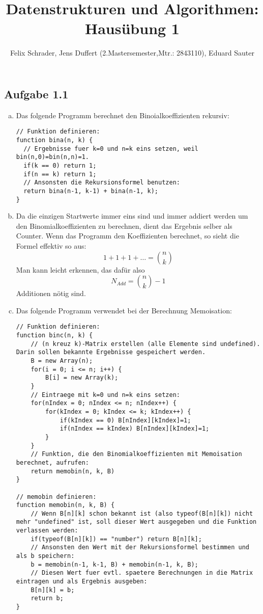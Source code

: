 \documentclass[11pt]{article}
\author{Felix Schrader, Jens Duffert (2.Mastersemester,Mtr.: 2843110), Eduard Sauter}
\title{Datenstrukturen und Algorithmen: Haus\"ubung 1}
\begin{document}
\maketitle

\subsection*{Aufgabe 1.1}
\begin{enumerate}[a)]

\item Das folgende Programm berechnet den Binoialkoeffizienten rekursiv:

\begin{lstlisting}
// Funktion definieren:
function bina(n, k) {
  // Ergebnisse fuer k=0 und n=k eins setzen, weil bin(n,0)=bin(n,n)=1.
  if(k == 0) return 1;
  if(n == k) return 1;
  // Ansonsten die Rekursionsformel benutzen:
  return bina(n-1, k-1) + bina(n-1, k);
}
\end{lstlisting}

\item Da die einzigen Startwerte immer eins sind und immer addiert werden um den Binomialkoeffizienten zu berechnen, dient das Ergebnis selber als Counter. Wenn das Programm den Koeffizienten berechnet, so sieht die Formel effektiv so aus:\[ 1+1+1+\dots =\binom{n}{k} \]
Man kann leicht erkennen, das daf\"ur also
\begin{equation}
N_{Add}=\binom{n}{k}-1
\end{equation}
Additionen n\"otig sind.

\item Das folgende Programm verwendet bei der Berechnung Memoisation:

\begin{lstlisting}
// Funktion definieren:
function binc(n, k) {
    // (n kreuz k)-Matrix erstellen (alle Elemente sind undefined). Darin sollen bekannte Ergebnisse gespeichert werden.
    B = new Array(n);
    for(i = 0; i <= n; i++) {
        B[i] = new Array(k);
    }
    // Eintraege mit k=0 und n=k eins setzen:
    for(nIndex = 0; nIndex <= n; nIndex++) {
        for(kIndex = 0; kIndex <= k; kIndex++) {
            if(kIndex == 0) B[nIndex][kIndex]=1;
            if(nIndex == kIndex) B[nIndex][kIndex]=1;
        }
    }
    // Funktion, die den Binomialkoeffizienten mit Memoisation berechnet, aufrufen:
    return memobin(n, k, B)
}

// memobin definieren:
function memobin(n, k, B) {
    // Wenn B[n][k] schon bekannt ist (also typeof(B[n][k]) nicht mehr "undefined" ist, soll dieser Wert ausgegeben und die Funktion verlassen werden:
    if(typeof(B[n][k]) == "number") return B[n][k];
    // Ansonsten den Wert mit der Rekursionsformel bestimmen und als b speichern:
    b = memobin(n-1, k-1, B) + memobin(n-1, k, B);
    // Diesen Wert fuer evtl. spaetere Berechnungen in die Matrix eintragen und als Ergebnis ausgeben:
    B[n][k] = b;
    return b;
}
\end{lstlisting}

\end{enumerate}
\end{document}
